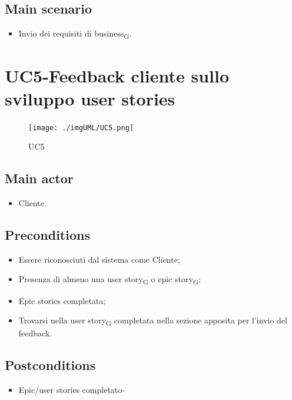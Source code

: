 \documentclass{article}
\begin{document}
        \subsection*{Main scenario}
        \begin{itemize}
        \item Invio dei requisiti di business\textsubscript{G}.
        \end{itemize}


\section{UC5-Feedback cliente sullo sviluppo user stories}
    \begin{figure}[h]
      \centering
      \texttt{[image: ./imgUML/UC5.png]}
        \caption{UC5}
      \label{fig:UC5}
    \end{figure}
    
    \subsection*{Main actor}
    \begin{itemize}
        \item Cliente.
    \end{itemize}
    
    \subsection*{Preconditions}
    \begin{itemize}
        \item Essere riconosciuti dal sistema come Cliente;
        \item Presenza di almeno una user story\textsubscript{G}  o epic story\textsubscript{G};
        \item Epic stories completata;
        \item Trovarsi nella user story\textsubscript{G} completata nella sezione apposita per l'invio del feedback.
    \end{itemize}
    
    \subsection*{Postconditions}
    \begin{itemize}
        \item Epic/user stories completato-
    \end{itemize}
    
\end{document}
